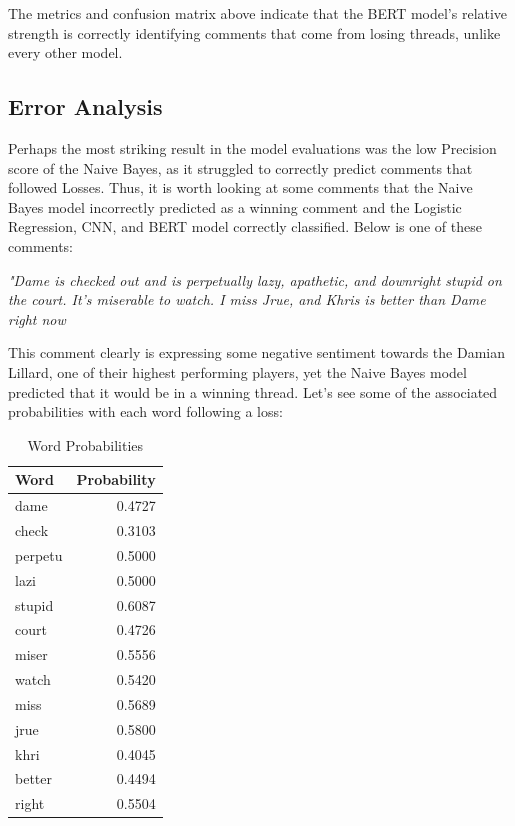 \documentclass[twocolumn]{article}
\begin{document}
The metrics and confusion matrix above indicate that the BERT model's relative strength is correctly identifying comments that come from losing threads, unlike every other model.

\subsection{Error Analysis}

Perhaps the most striking result in the model evaluations was the low Precision score of the Naive Bayes, as it struggled to correctly predict comments that followed Losses. Thus, it is worth looking at some comments that the Naive Bayes model incorrectly predicted as a winning comment and the Logistic Regression, CNN, and BERT model correctly classified. Below is one of these comments:

\begin{center}
\textit{"Dame is checked out and is perpetually lazy, apathetic, and downright stupid on the court. It’s miserable to watch. I miss Jrue, and Khris is better than Dame right now}
\end{center}

This comment clearly is expressing some negative sentiment towards the Damian Lillard, one of their highest performing players, yet the Naive Bayes model predicted that it would be in a winning thread. Let's see some of the associated probabilities with each word following a loss:

\begin{table}[H]
\centering
\begin{tabular}{l r}
\hline
Word & Probability \\
\hline
dame & 0.4727 \\
check & 0.3103 \\
perpetu & 0.5000 \\
lazi & 0.5000 \\
stupid & 0.6087 \\
court & 0.4726 \\
miser & 0.5556 \\
watch & 0.5420 \\
miss & 0.5689 \\
jrue & 0.5800 \\
khri & 0.4045 \\
better & 0.4494 \\
right & 0.5504 \\
\hline
\end{tabular}
\caption{Word Probabilities}
\label{tab:word_probabilities}
\end{table}
\end{document}
